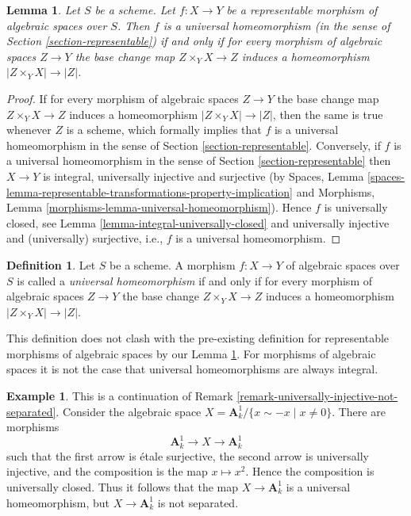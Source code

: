 \documentclass{stacks-project}
\theoremstyle{plain}
\newtheorem{lemma}[subsection]{Lemma}
\theoremstyle{definition}
\newtheorem{definition}[subsection]{Definition}
\newtheorem{example}[subsection]{Example}
\theoremstyle{remark}
\numberwithin{equation}{subsection}
\begin{document}
\begin{lemma}
\label{lemma-universal-homeomorphism-representable}
Let $S$ be a scheme.
Let $f : X \to Y$ be a representable morphism of algebraic spaces over $S$.
Then $f$ is a universal homeomorphism
(in the sense of Section \ref{section-representable}) if and only
if for every morphism of algebraic spaces $Z \to Y$ the base change
map $Z \times_Y X \to Z$ induces a homeomorphism
$|Z \times_Y X| \to |Z|$.
\end{lemma}

\begin{proof}
If for every morphism of algebraic spaces $Z \to Y$ the base change
map $Z \times_Y X \to Z$ induces a homeomorphism
$|Z \times_Y X| \to |Z|$, then the same is true whenever $Z$ is a scheme,
which formally implies that $f$ is a universal homeomorphism in the
sense of
Section \ref{section-representable}.
Conversely, if $f$ is a universal homeomorphism in the sense of
Section \ref{section-representable}
then $X \to Y$ is integral, universally injective and surjective
(by Spaces, Lemma
\ref{spaces-lemma-representable-transformations-property-implication}
and
Morphisms, Lemma \ref{morphisms-lemma-universal-homeomorphism}).
Hence $f$ is universally closed, see
Lemma \ref{lemma-integral-universally-closed}
and universally injective and (universally) surjective, i.e.,
$f$ is a universal homeomorphism.
\end{proof}

\begin{definition}
\label{definition-universal-homeomorphism}
Let $S$ be a scheme.
A morphism $f : X \to Y$ of algebraic spaces over $S$
is called a {\it universal homeomorphism}
if and only if for every morphism of algebraic spaces $Z \to Y$
the base change $Z \times_Y X \to Z$ induces a homeomorphism
$|Z \times_Y X| \to |Z|$.
\end{definition}

\noindent
This definition does not clash with the pre-existing definition for
representable morphisms of algebraic spaces by our
Lemma \ref{lemma-universal-homeomorphism-representable}.
For morphisms of algebraic spaces it is not the case that universal
homeomorphisms are always integral.

\begin{example}
\label{example-universal-homeomorphism}
This is a continuation of
Remark \ref{remark-universally-injective-not-separated}.
Consider the algebraic space
$X = \mathbf{A}^1_k/\{x \sim -x \mid x \not = 0\}$.
There are morphisms
$$
\mathbf{A}^1_k \longrightarrow X \longrightarrow \mathbf{A}^1_k
$$
such that the first arrow is \'etale surjective, the second arrow is
universally injective, and the composition is the map $x \mapsto x^2$.
Hence the composition is universally closed. Thus it follows that the
map $X \to \mathbf{A}^1_k$ is a universal homeomorphism, but
$X \to \mathbf{A}^1_k$ is not separated.
\end{example}
\end{document}
